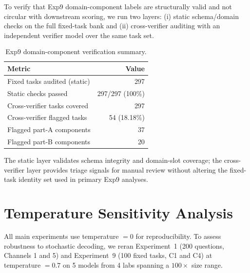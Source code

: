 \documentclass[10pt]{article}
\begin{document}
To verify that Exp9 domain-component labels are structurally valid and not
circular with downstream scoring, we run two layers: (i) static schema/domain
checks on the full fixed-task bank and (ii) cross-verifier auditing with an
independent verifier model over the same task set.

\begin{table}[h]
\centering
\caption{Exp9 domain-component verification summary.}
\label{tab:exp9-mapping-validity}
\small
\begin{tabular}{lr}
\toprule
Metric & Value \\
\midrule
Fixed tasks audited (static) & 297 \\
Static checks passed & 297/297 (100\%) \\
Cross-verifier tasks covered & 297 \\
Cross-verifier flagged tasks & 54 (18.18\%) \\
Flagged part-A components & 37 \\
Flagged part-B components & 20 \\
\bottomrule
\end{tabular}
\end{table}

The static layer validates schema integrity and domain-slot coverage; the
cross-verifier layer provides triage signals for manual review without altering
the fixed-task identity set used in primary Exp9 analyses.

\section{Temperature Sensitivity Analysis}
\label{app:temp}

All main experiments use temperature $= 0$ for reproducibility. To assess robustness to stochastic decoding, we reran Experiment~1 (200 questions, Channels 1 and 5) and Experiment~9 (100 fixed tasks, C1 and C4) at temperature $= 0.7$ on 5 models from 4 labs spanning a $100\times$ size range.
\end{document}
